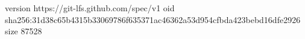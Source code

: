 version https://git-lfs.github.com/spec/v1
oid sha256:31d38c65b4315b33069786f635371ac46362a53d954cfbda423bebd16dfe2926
size 87528
